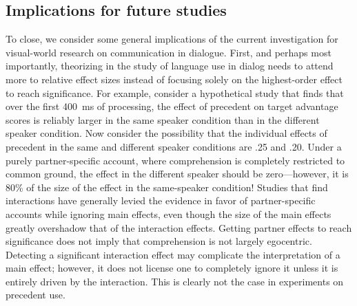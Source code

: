 \documentclass[doc,fignum,apacite,floatsintext]{apa6}
\begin{document}
\subsection{Implications for future studies}

To close, we consider some general implications of the current investigation for visual-world research on communication in dialogue.  First, and perhaps most importantly, theorizing in the study of language use in dialog needs to attend more to relative effect sizes instead of focusing solely on the highest-order effect to reach significance.  For example, consider a hypothetical study that finds that over the first 400~ms of processing, the effect of precedent on target advantage scores is reliably larger in the same speaker condition than in the different speaker condition.  Now consider the possibility that the individual effects of precedent in the same and different speaker conditions are .25 and .20.  Under a purely partner-specific account, where comprehension is completely restricted to common ground, the effect in the different speaker should be zero---however, it is 80\% of the size of the effect in the same-speaker condition!  Studies that find interactions have generally levied the evidence in favor of partner-specific accounts while ignoring main effects, even though the size of the main effects greatly overshadow that of the interaction effects.  Getting partner effects to reach significance does not imply that comprehension is not largely egocentric.  Detecting a significant interaction effect may complicate the interpretation of a main effect; however, it does not license one to completely ignore it unless it is entirely driven by the interaction.  This is clearly not the case in experiments on precedent use.
\end{document}

